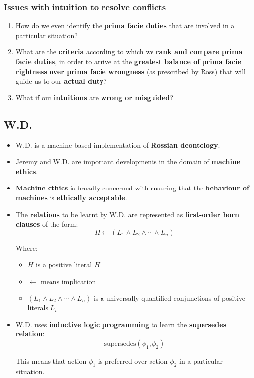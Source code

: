 \documentclass[11pt]{article}
\begin{document}
\subsubsection{Issues with intuition to resolve conflicts}
\label{sec:orgf801137}
\begin{enumerate}
\item How do we even identify the \textbf{prima facie duties} that are involved in a particular situation?
\item What are the \textbf{criteria} according to which we \textbf{rank and compare prima facie duties}, in order to arrive at the \textbf{greatest balance of prima facie rightness over prima facie wrongness} (as prescribed by Ross) that will guide us to our \textbf{actual duty}?
\item What if our \textbf{intuitions} are \textbf{wrong or misguided}?
\end{enumerate}
\subsection{W.D.}
\label{sec:org5246401}
\begin{itemize}
\item W.D. is a machine-based implementation of \textbf{Rossian deontology}.
\item Jeremy and W.D. are important developments in the domain of \textbf{machine ethics}.
\item \textbf{Machine ethics} is broadly concerned with ensuring that the \textbf{behaviour of machines} is \textbf{ethically acceptable}.
\item The \textbf{relations} to be learnt by W.D. are represented as \textbf{first-order horn clauses} of the form:
\[H \leftarrow (L_1 \wedge L_2 \wedge \cdots \wedge L_n)\]

Where:
\begin{itemize}
\item \(H\) is a positive literal \(H\)
\item \(\leftarrow\) means implication
\item \((L_1 \wedge L_2 \wedge \cdots \wedge L_n)\) is a universally quantified conjunctions of positive literals \(L_i\)
\end{itemize}
\item W.D. uses \textbf{inductive logic programming} to learn the \textbf{supersedes relation}:
\[\text{supersedes}(\phi_1, \phi_2)\]

This means that action \(\phi_1\) is preferred over action \(\phi_2\) in a particular situation.
\end{itemize}
\end{document}
